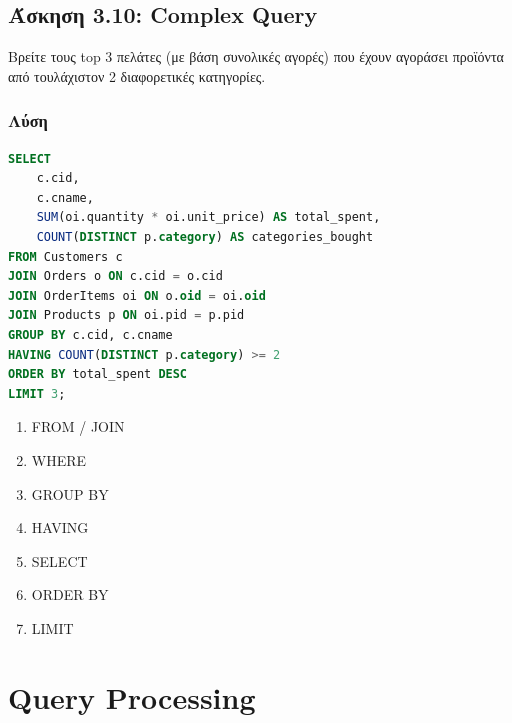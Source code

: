 \subsection{Άσκηση 3.10: Complex Query}

\begin{formulabox}[Εκφώνηση]
Βρείτε τους top 3 πελάτες (με βάση συνολικές αγορές) που έχουν αγοράσει προϊόντα
από τουλάχιστον 2 διαφορετικές κατηγορίες.
\end{formulabox}

\subsubsection*{Λύση}

\begin{lstlisting}[language=SQL]
SELECT
    c.cid,
    c.cname,
    SUM(oi.quantity * oi.unit_price) AS total_spent,
    COUNT(DISTINCT p.category) AS categories_bought
FROM Customers c
JOIN Orders o ON c.cid = o.cid
JOIN OrderItems oi ON o.oid = oi.oid
JOIN Products p ON oi.pid = p.pid
GROUP BY c.cid, c.cname
HAVING COUNT(DISTINCT p.category) >= 2
ORDER BY total_spent DESC
LIMIT 3;
\end{lstlisting}

\begin{infobox}
\begin{enumerate}
    \item FROM / JOIN
    \item WHERE
    \item GROUP BY
    \item HAVING
    \item SELECT
    \item ORDER BY
    \item LIMIT
\end{enumerate}
\end{infobox}


\section{Query Processing}

